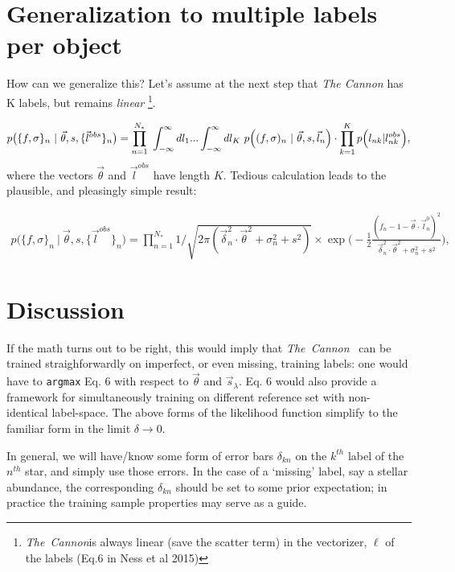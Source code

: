 \documentclass[12pt, letterpaper, preprint]{aastex}
\newcommand{\tc}{\textsl{The~Cannon}}
\newcommand{\set}[1]{\{#1\}}
\newcommand{\vl}{\vec{l}}
\newcommand{\vthe}{\vec{\theta}}
\newcommand{\vdel}{\vec{\delta}}
\newcommand{\vlobs}{\vec{l}^{obs}}
\begin{document}
\section{Generalization to multiple labels per object}

How can we generalize this? Let's assume at the next step that {\it The Cannon} has K labels, but remains {\it linear}
\footnote{\tc is always linear (save the scatter term) in the vectorizer, $\ell$ of the labels (Eq.6 in Ness et al 2015)      }.

\begin{equation}
\begin{aligned}
p\bigl ( \set{f,\sigma}_n~|~ \vthe, s, \set{\vlobs}_n\bigr )=
\prod_{n=1}^{N_*} \  \int_{-\infty}^\infty dl_1 ...  \int_{-\infty}^\infty dl_K~
p\Bigl ( (f,\sigma)_n~|~ \vthe, s, \vl_n\Bigr )\cdot
\prod_{k=1}^K p\Bigl ( l_{nk} | l^{obs}_{nk}\Bigr ),
\end{aligned}
\end{equation}
where the vectors $\vthe$ and $\vlobs$ have length $K$.
Tedious calculation leads to the plausible, and pleasingly simple result:

\begin{equation}
\begin{aligned}
p\bigl ( \set{f,\sigma}_n~|~ \vthe, s, \set{\vlobs}_n\bigr )=
\prod_{n=1}^{N_*} 1/\sqrt{2\pi (\vdel_n^2\cdot\vthe^2 + \sigma_n^2+s^2)}\times
\exp{\Biggl ( -\frac{1}{2}\frac{(f_n-1-\vthe \cdot \vec{l}^0_n)^2}{\vdel_n^2\cdot\vthe^2+\sigma_n^2+s^2}\Biggr )},
\end{aligned}
\end{equation}

\section{Discussion}

If the math turns out to be right, this would imply that \tc~ can be trained straighforwardly on imperfect, or even missing, training labels: one would
have to {\tt argmax} Eq. 6 with respect to $\vthe$ and $\vec{s}_\lambda$.
Eq. 6 would also provide a framework for simultaneously training on different reference set with non-identical label-space.
The above forms of the likelihood function simplify to the familiar form in the limit $\delta \rightarrow 0$. 

In general, we will have/know some form of error bars $\delta_{kn}$ on the $k^{th}$ label of the $n^{th}$ star, and simply use those errors.
In the case of a `missing' label, say a stellar abundance, the corresponding
$\delta_{kn}$ should be set to some prior expectation; in practice the training sample properties may serve as a guide.
\end{document}
